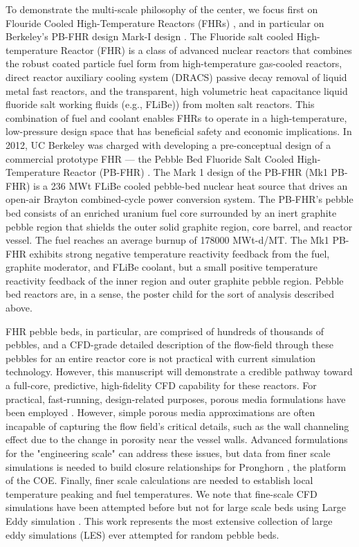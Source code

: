 To demonstrate the multi-scale philosophy of the center, we focus first on Flouride Cooled High-Temperature Reactors (FHRs) \cite{forsberg2015fluoride}, and in particular on Berkeley's PB-FHR design Mark-I design \cite{cisneros2014technical}. The Fluoride salt cooled High-temperature Reactor (FHR) is a class of advanced nuclear reactors that combines the robust coated particle fuel form from high-temperature gas-cooled reactors, direct reactor auxiliary cooling system (DRACS) passive decay removal of liquid metal fast reactors, and the transparent, high volumetric heat capacitance liquid fluoride salt working fluids (e.g., FLiBe)) from molten salt reactors. This combination of fuel and coolant enables FHRs to operate in a high-temperature, low-pressure design space that has beneficial safety and economic implications. In 2012, UC Berkeley was charged with developing a pre-conceptual design of a commercial prototype FHR --- the Pebble Bed Fluoride Salt Cooled High-Temperature Reactor (PB-FHR) \cite{cisneros2014technical}. The Mark 1 design of the PB-FHR (Mk1 PB-FHR) is a 236 MWt FLiBe cooled pebble-bed nuclear heat source that drives an open-air Brayton combined-cycle power conversion system. The PB-FHR's pebble bed consists of an enriched uranium fuel core surrounded by an inert graphite pebble region that shields the outer solid graphite region, core barrel, and reactor vessel. The fuel reaches an average burnup of 178000 MWt-d/MT. The Mk1 PB-FHR exhibits strong negative temperature reactivity feedback from the fuel, graphite moderator, and FLiBe coolant, but a small positive temperature reactivity feedback of the inner region and outer graphite pebble region. Pebble bed reactors are, in a sense, the poster child for the sort of analysis described above.

FHR pebble beds, in particular, are comprised of hundreds of thousands of pebbles, and a CFD-grade detailed description of the flow-field through these pebbles for an entire reactor core is not practical with current simulation technology. However, this manuscript will demonstrate a credible pathway toward a full-core, predictive, high-fidelity CFD capability for these reactors. For practical, fast-running, design-related purposes, porous media formulations have been employed  \cite{zou2017validation}. However, simple porous media approximations are often incapable of capturing the flow field's critical details, such as the wall channeling effect due to the change in porosity near the vessel walls.  Advanced formulations for the "engineering scale" can address these issues, but data from finer scale simulations is needed to build closure relationships for Pronghorn \cite{novak2018pronghorn}, the platform of the COE. Finally, finer scale calculations are needed to establish local temperature peaking and fuel temperatures. We note that fine-scale CFD simulations have been attempted before but not for large scale beds using Large Eddy simulation \cite{vanstaden2018}. This work represents the most extensive collection of large eddy simulations  (LES) ever attempted for random pebble beds.

